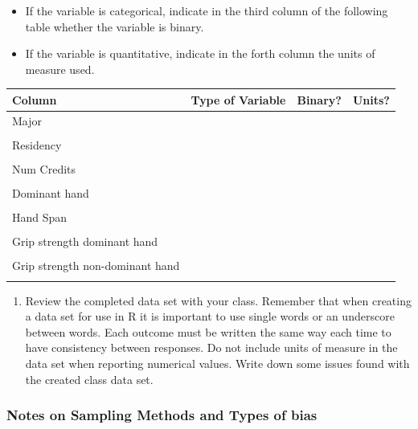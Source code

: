 \documentclass[
]{report}
\providecommand{\tightlist}{%
  \setlength{\itemsep}{0pt}\setlength{\parskip}{0pt}}
\begin{document}
\begin{itemize}
\item
  If the variable is categorical, indicate in the third column of the following table whether the variable is binary.
\item
  If the variable is quantitative, indicate in the forth column the units of measure used.
\end{itemize}

\begin{center}
\begin{tabular}{|l|p{1.5in}|p{0.5in}|p{0.5in}|} \hline
Column & Type of Variable & Binary? & Units? \\ \hline
Major & & &\\
& & & \\ \hline
Residency & & & \\
& & & \\ \hline
Num Credits & & & \\
& & & \\ \hline
Dominant hand & & & \\
& & & \\ \hline
Hand Span & & & \\
& & & \\ \hline
Grip strength dominant hand & & & \\
& & & \\ \hline
Grip strength non-dominant hand & & & \\
& & & \\ \hline
\end{tabular}
\end{center}

\begin{enumerate}
\def\labelenumi{\arabic{enumi}.}
\setcounter{enumi}{3}
\tightlist
\item
  Review the completed data set with your class. Remember that when creating a data set for use in R it is important to use single words or an underscore between words. Each outcome must be written the same way each time to have consistency between responses. Do not include units of measure in the data set when reporting numerical values. Write down some issues found with the created class data set.
\end{enumerate}

\vspace{2.5in}

\subsubsection*{Notes on Sampling Methods and Types of bias}\label{notes-on-sampling-methods-and-types-of-bias}
\end{document}
